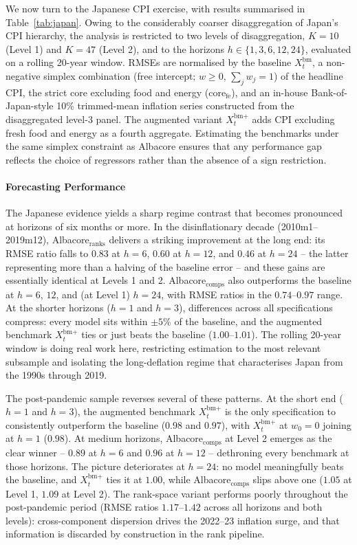 We now turn to the Japanese CPI exercise, with results summarised in Table~\ref{tab:japan}. Owing to the considerably coarser disaggregation of Japan's CPI hierarchy, the analysis is restricted to two levels of disaggregation, $K=10$ (Level 1) and $K=47$ (Level 2), and to the horizons $h \in \{1, 3, 6, 12, 24\}$, evaluated on a rolling 20-year window. RMSEs are normalised by the baseline $X^{\text{bm}}_t$, a non-negative simplex combination (free intercept; $w \ge 0$, $\sum_j w_j = 1$) of the headline CPI, the strict core excluding food and energy ($\text{core}_{\text{fe}}$), and an in-house Bank-of-Japan-style 10\% trimmed-mean inflation series constructed from the disaggregated level-3 panel. The augmented variant $X^{\text{bm}+}_t$ adds CPI excluding fresh food and energy as a fourth aggregate. Estimating the benchmarks under the same simplex constraint as Albacore ensures that any performance gap reflects the choice of regressors rather than the absence of a sign restriction.

\paragraph{Forecasting Performance} The Japanese evidence yields a sharp regime contrast that becomes pronounced at horizons of six months or more. In the disinflationary decade (2010m1--2019m12), Albacore$_{\text{ranks}}$ delivers a striking improvement at the long end: its RMSE ratio falls to $0.83$ at $h=6$, $0.60$ at $h=12$, and $0.46$ at $h=24$ -- the latter representing more than a halving of the baseline error -- and these gains are essentially identical at Levels 1 and 2. Albacore$_{\text{comps}}$ also outperforms the baseline at $h=6$, $12$, and (at Level 1) $h=24$, with RMSE ratios in the $0.74$--$0.97$ range. At the shorter horizons ($h=1$ and $h=3$), differences across all specifications compress: every model sits within $\pm 5\%$ of the baseline, and the augmented benchmark $X^{\text{bm}+}_t$ ties or just beats the baseline ($1.00$--$1.01$). The rolling 20-year window is doing real work here, restricting estimation to the most relevant subsample and isolating the long-deflation regime that characterises Japan from the 1990s through 2019.

The post-pandemic sample reverses several of these patterns. At the short end ($h=1$ and $h=3$), the augmented benchmark $X^{\text{bm}+}_t$ is the only specification to consistently outperform the baseline ($0.98$ and $0.97$), with $X^{\text{bm}+}_t$ at $w_0 = 0$ joining at $h=1$ ($0.98$). At medium horizons, Albacore$_{\text{comps}}$ at Level 2 emerges as the clear winner -- $0.89$ at $h=6$ and $0.96$ at $h=12$ -- dethroning every benchmark at those horizons. The picture deteriorates at $h=24$: no model meaningfully beats the baseline, and $X^{\text{bm}+}_t$ ties it at $1.00$, while Albacore$_{\text{comps}}$ slips above one ($1.05$ at Level 1, $1.09$ at Level 2). The rank-space variant performs poorly throughout the post-pandemic period (RMSE ratios $1.17$--$1.42$ across all horizons and both levels): cross-component dispersion drives the 2022--23 inflation surge, and that information is discarded by construction in the rank pipeline.

